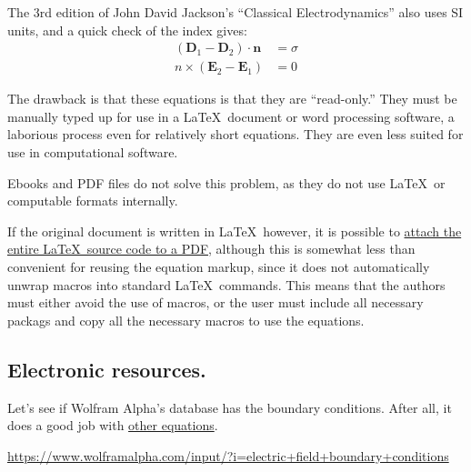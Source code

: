 \documentclass[12pt,letterpaper]{article}
\begin{document}
The 3rd edition of John David Jackson's ``Classical Electrodynamics'' also uses SI units,
and a quick check of the index gives:
\begin{align*}
(\mathbf{D}_1 - \mathbf{D}_2)\cdot \mathbf{n} &= \sigma \\
n \times (\mathbf{E}_2 - \mathbf{E}_1) &= 0
\end{align*}

The drawback is that these equations is that they are ``read-only.''
They must be manually typed up for use in a \LaTeX\ document or word processing software,
a laborious process even for relatively short equations.
They are even less suited for use in computational software.


Ebooks and PDF files do not solve this problem,
as they do not use \LaTeX\ or computable formats internally.

If the original document is written in \LaTeX\, however,
it is possible to
\href{http://www.ctan.org/pkg/embedfile}
{attach the entire \LaTeX\ source code to a PDF},
although this is somewhat less than convenient for reusing the equation markup,
since it does not automatically unwrap macros into standard \LaTeX\ commands.
This means that the authors must either avoid the use of macros,
or the user must include all necessary packags and copy all the necessary macros to use the equations.

\subsection{Electronic resources.}

Let's see if Wolfram Alpha's database has the boundary conditions.
After all,
it does a good job with
\href{https://www.wolframalpha.com/input/?i=particle+in+a+magnetic+field}
{other equations}.

\url{https://www.wolframalpha.com/input/?i=electric+field+boundary+conditions}
\end{document}
